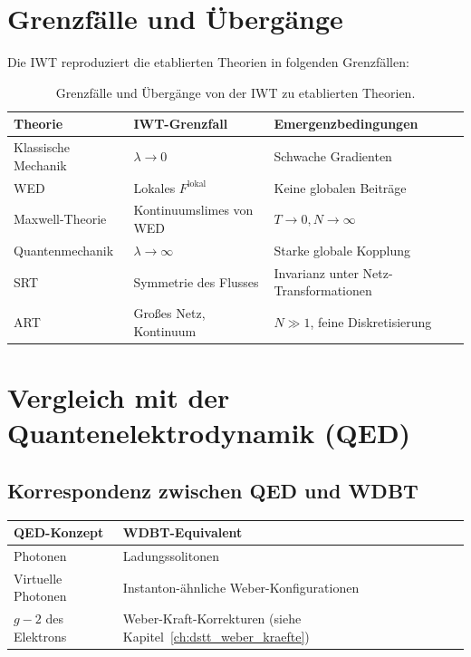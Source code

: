 \section{Grenzfälle und Übergänge}
\label{app:vergleich_grenzfaelle}

Die IWT reproduziert die etablierten Theorien in folgenden Grenzfällen:

\begin{table}[htbp]
\centering
\small
\begin{tabularx}{\textwidth}{|X|X|X|}
\hline
\textbf{Theorie} & \textbf{IWT-Grenzfall} & \textbf{Emergenzbedingungen} \\
\hline
Klassische Mechanik & \( \lambda \to 0 \) & Schwache Gradienten \\
WED & Lokales \( F^{\text{lokal}} \) & Keine globalen Beiträge \\
Maxwell-Theorie & Kontinuumslimes von WED & \( T \to 0, N \to \infty \) \\
Quantenmechanik & \( \lambda \to \infty \) & Starke globale Kopplung \\
SRT & Symmetrie des Flusses & Invarianz unter Netz-Transformationen \\
ART & Großes Netz, Kontinuum & \( N \gg 1 \), feine Diskretisierung \\
\hline
\end{tabularx}
\caption{Grenzfälle und Übergänge von der IWT zu etablierten Theorien.}
\label{tab:grenzfaelle}
\end{table}

\section{Vergleich mit der Quantenelektrodynamik (QED)}
\label{app:vergleich_qed}

\subsection{Korrespondenz zwischen QED und WDBT}
\label{sub:vergleich_qed_korrespondenz}

\begin{tabular}{|l|l|}
\hline
\textbf{QED-Konzept} & \textbf{WDBT-Equivalent} \\
\hline
Photonen & Ladungssolitonen \\
Virtuelle Photonen & Instanton-ähnliche Weber-Konfigurationen \\
\( g-2 \) des Elektrons & Weber-Kraft-Korrekturen (siehe Kapitel~\ref{ch:dstt_weber_kraefte}) \\
\hline
\end{tabular}

